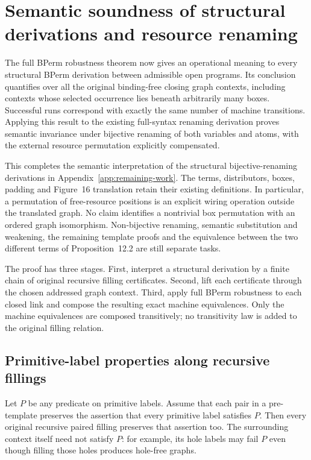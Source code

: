 \clearpage
\section{Semantic soundness of structural derivations and resource renaming}
\label{sec:copying-semantic-renaming}
The full BPerm robustness theorem now gives an operational meaning to every
structural BPerm derivation between admissible open programs. Its conclusion
quantifies over all the original binding-free closing graph contexts, including
contexts whose selected occurrence lies beneath arbitrarily many boxes.
Successful runs correspond with exactly the same number of machine transitions.
Applying this result to the existing full-syntax renaming derivation proves
semantic invariance under bijective renaming of both variables and atoms, with
the external resource permutation explicitly compensated.

This completes the semantic interpretation of the structural bijective-renaming
derivations in Appendix~\ref{app:remaining-work}. The terms, distributors, boxes,
padding and Figure~16 translation retain their existing definitions. In
particular, a permutation of free-resource positions is an explicit wiring
operation outside the translated graph. No claim identifies a nontrivial box
permutation with an ordered graph isomorphism. Non-bijective renaming, semantic
substitution and weakening, the remaining template proofs and the equivalence
between the two different terms of Proposition~12.2 are still separate tasks.

The proof has three stages. First, interpret a structural derivation by a finite
chain of original recursive filling certificates. Second, lift each certificate
through the chosen addressed graph context. Third, apply full BPerm robustness
to each closed link and compose the resulting exact machine equivalences.
Only the machine equivalences are composed transitively; no transitivity law
is added to the original filling relation.

\subsection{Primitive-label properties along recursive fillings}
Let $P$ be any predicate on primitive labels. Assume that each pair in a
pre-template preserves the assertion that every primitive label satisfies $P$.
Then every original recursive paired filling preserves that assertion too.
The surrounding context itself need not satisfy $P$: for example, its hole
labels may fail $P$ even though filling those holes produces hole-free graphs.

